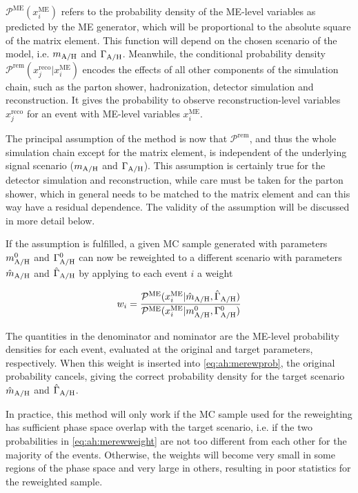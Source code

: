 $\mathcal{P}^{\mathrm{ME}} (x_i^{\mathrm{ME}})$ refers to the probability density of the ME-level variables as predicted by the ME generator, which will be proportional to the absolute square of the matrix element. This function will depend on the chosen scenario of the \AH model, i.e. $m_{\mathrm{A/H}}$ and $\Gamma_{\mathrm{A/H}}$. Meanwhile, the conditional probability density $\mathcal{P}^{\mathrm{rem}} (x_j^{\mathrm{reco}} | x_i^{\mathrm{ME}})$ encodes the effects of all other components of the simulation chain, such as the parton shower, hadronization, detector simulation and reconstruction. It gives the probability to observe reconstruction-level variables $x_j^{\mathrm{reco}}$ for an event with ME-level variables $x_i^{\mathrm{ME}}$.

The principal assumption of the method is now that $\mathcal{P}^{\mathrm{rem}}$, and thus the whole simulation chain except for the matrix element, is independent of the underlying \AH signal scenario ($m_{\mathrm{A/H}}$ and $\Gamma_{\mathrm{A/H}}$). This assumption is certainly true for the detector simulation and reconstruction, while care must be taken for the parton shower, which in general needs to be matched to the matrix element and can this way have a residual dependence. The validity of the assumption will be discussed in more detail below.

If the assumption is fulfilled, a given \AH MC sample generated with parameters $m_{\mathrm{A/H}}^0$ and $\Gamma_{\mathrm{A/H}}^0$ can now be reweighted to a different \AH scenario with parameters $\hat{m}_{\mathrm{A/H}}$ and $\hat{\Gamma}_{\mathrm{A/H}}$ by applying to each event $i$ a weight 

\begin{equation}
\label{eq:ah:merewweight}
    w_i = \frac{ \mathcal{P}^{\mathrm{ME}} (x_i^{\mathrm{ME}} | \hat{m}_{\mathrm{A/H}} , \hat{\Gamma}_{\mathrm{A/H}} ) } { \mathcal{P}^{\mathrm{ME}} (x_i^{\mathrm{ME}} | m_{\mathrm{A/H}}^0 , \Gamma_{\mathrm{A/H}}^0 ) }
\end{equation}

The quantities in the denominator and nominator are the ME-level probability densities for each event, evaluated at the original and target \AH parameters, respectively. When this weight is inserted into \cref{eq:ah:merewprob}, the original probability cancels, giving the correct probability density for the target scenario $\hat{m}_{\mathrm{A/H}}$ and $\hat{\Gamma}_{\mathrm{A/H}}$.

In practice, this method will only work if the MC sample used for the reweighting has sufficient phase space overlap with the target \AH scenario, i.e. if the two probabilities in \cref{eq:ah:merewweight} are not too different from each other for the majority of the events. Otherwise, the weights will become very small in some regions of the phase space and very large in others, resulting in poor statistics for the reweighted sample.

